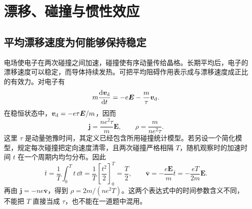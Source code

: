 \section{漂移、碰撞与惯性效应}
\subsection{平均漂移速度为何能够保持稳定}

电场使电子在两次碰撞之间加速，碰撞使有序动量传给晶格。长期平均后，电子的漂移速度可以稳定，而导体持续发热。可把平均阻碍作用表示成与漂移速度成正比的有效力。对电子有
\[
 m\frac{\mathop{}\!\mathrm d\bm v_{\rm d}}{\mathop{}\!\mathrm d t}=-e\bm E-\frac m\tau\bm v_{\rm d}.
\]
在稳恒状态中，$\bm v_{\rm d}=-e\tau\bm E/m$，因而
\[
 \bm j=\frac{ne^2\tau}{m}\bm E,\qquad
 \rho=\frac{m}{ne^2\tau}.
\]
这里 $\tau$ 是动量弛豫时间，其定义已经包含所用碰撞统计模型。若另设一个简化模型，规定每次碰撞把定向速度清零，且两次碰撞严格相隔 $T$，随机观察时的加速时间 $t$ 在一个周期内均匀分布。因此
\[
 \overline t=\frac1T\int_0^Tt\,\dd t
 =\frac1T\left[\frac{t^2}{2}\right]_0^T=\frac T2,
 \qquad \overline{\bm v}=-\frac{e\bm E}{m}\overline t
 =-\frac{eT}{2m}\bm E.
\]
再由 $\bm j=-ne\overline{\bm v}$，得到 $\rho=2m/(ne^2T)$。这两个表达式中的时间参数含义不同，不能把 $T$ 直接当成 $\tau$，也不能在一道题中混用。

